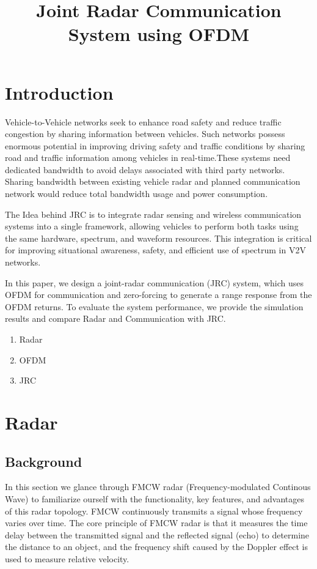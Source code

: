 \documentclass[conference]{IEEEtran}
\title{Joint Radar Communication System using OFDM}
\author{

\IEEEauthorblockN{Owen Sowatzke}
\IEEEauthorblockA{\textit{Electrical Engineering Department} \\
\textit{University of Arizona}\\
Tucson, USA \\
osowatzke@arizona.edu}

\and
\IEEEauthorblockN{Iman Miraki}
\IEEEauthorblockA{\textit{Electrical Engineering Department} \\
\textit{University of Arizona}\\
Tucson, USA \\
imanmiraki@arizona.edu}}
\begin{document}
	\raggedbottom
	\maketitle
\section {Introduction}
     Vehicle-to-Vehicle networks seek to enhance road safety and reduce traffic congestion by sharing information between vehicles. Such networks possess enormous potential in improving driving safety and traffic conditions by sharing road and traffic information among vehicles in real-time.These systems need dedicated bandwidth to avoid delays associated with third party networks. Sharing bandwidth between existing vehicle radar and planned communication network would reduce total bandwidth usage and power consumption.\par
     The Idea behind JRC is to integrate radar sensing and wireless communication systems into a single framework, allowing vehicles to perform both tasks using the same hardware, spectrum, and waveform resources. This integration is critical for improving situational awareness, safety, and efficient use of spectrum in V2V networks.\par
     In this paper, we design a joint-radar communication (JRC) system, which uses OFDM for communication and zero-forcing to generate a range response from the OFDM returns. To evaluate the system performance, we provide the simulation results and compare Radar and Communication with JRC.
     
\begin{enumerate}
	\item Radar
	\item OFDM
	\item JRC
\end{enumerate}
        
  \section {Radar}
   \subsection {Background}
   
In this section we glance through FMCW radar (Frequency-modulated Continous Wave) to familiarize ourself with the functionality, key features, and advantages of this radar topology. FMCW continuously transmits a signal whose frequency varies over time. The core principle of FMCW radar is that it measures the time delay between the transmitted signal and the reflected signal (echo) to determine the distance to an object, and the frequency shift caused by the Doppler effect is used to measure relative velocity.
\end{document}

